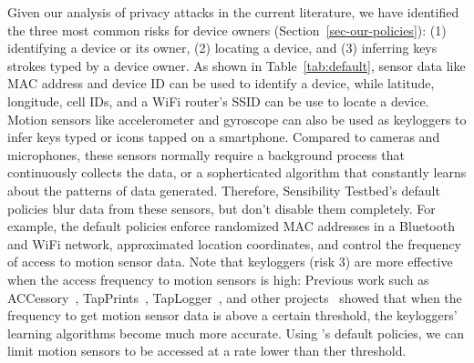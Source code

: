 Given our analysis of privacy attacks in the current literature, 
we have identified the three 
most common 
risks for device owners (Section~\ref{sec-our-policies}): (1) identifying a device or its owner, 
(2) locating a device, and (3) inferring keys strokes typed by a device owner. 
As shown in Table~\ref{tab:default}, 
sensor data like MAC address and device ID can be used to identify a device, while latitude, longitude, cell 
IDs, and a WiFi router's SSID can be use to locate a 
device. Motion sensors like accelerometer and gyroscope can also be used
as keyloggers to infer keys typed or icons tapped on a 
smartphone. Compared to cameras and microphones, these 
sensors normally require a background process that continuously 
collects the data, or a sopherticated algorithm that constantly learns 
about the patterns of data generated. 
Therefore, Sensibility Testbed's default policies 
blur data from these sensors, but don't disable them completely. 
For example, the default policies enforce randomized MAC addresses in a 
Bluetooth and WiFi network, approximated location coordinates, and 
control the frequency of access to motion sensor data. Note that keyloggers (risk 3)
are more effective when the access frequency to motion sensors is 
high: Previous work such as ACCessory~\cite{owusu2012accessory}, 
TapPrints~\cite{miluzzo2012tapprints}, TapLogger~\cite{xu2012taplogger}, 
and other projects~\cite{aviv2012practicality} showed that when the 
frequency to get motion sensor data is above a certain threshold, the keyloggers' 
learning algorithms become much more accurate.  
Using \sysname's default policies, we can limit 
motion sensors to be accessed at a rate lower than ther threshold. 




